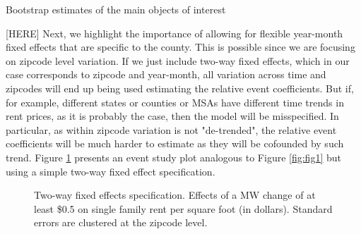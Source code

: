 \begin{table}[h!]
    \centering
    \caption{Bootstrap estimates of the main objects of interest}
    \resizebox{\textwidth}{!}{
    
    }
    \label{tab:bootstrap_table}
\end{table}

[HERE]
Next, we highlight the importance of allowing for flexible year-month fixed effects that are specific to the county. This is possible since we are focusing on zipcode level variation. If we just include two-way fixed effects, which in our case corresponds to zipcode and year-month, all variation across time and zipcodes will end up being used estimating the relative event coefficients. But if, for example, different states or counties or MSAs have different time trends in rent prices, as it is probably the case, then the model will be misspecified. In particular, as within zipcode variation is not "de-trended", the relative event coefficients will be much harder to estimate as they will be cofounded by such trend. Figure \ref{fig:fig2} presents an event study plot analogous to Figure \ref{fig:fig1} but using a simple two-way fixed effect specification. 

\begin{figure}[h!]
    \centering
    \caption{Two-way fixed effects specification. Effects of a MW change of at least \$0.5 on single family rent per square foot (in dollars). Standard errors are clustered at the zipcode level.}
    \label{fig:fig2}
\end{figure}

